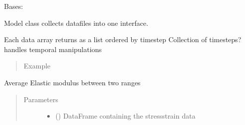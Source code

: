 \documentclass[letterpaper,10pt,english]{sphinxmanual}
\begin{document}
\begin{fulllineitems}
\label{\detokenize{openfdem:openfdem.openfdem.Model}}
Bases: 

Model class collects datafiles into one interface.

Each data array returns as a list ordered by timestep
Collection of timesteps?
handles temporal manipulations
\begin{quote}\begin{description}
\item[{Example}] \leavevmode
\begin{sphinxVerbatim}[commandchars=\\\{\}]
   
  
\end{sphinxVerbatim}

\end{description}\end{quote}

\begin{fulllineitems}
\label{\detokenize{openfdem:openfdem.openfdem.Model.Eavg_mod}}
Average Elastic modulus between two ranges
\begin{quote}\begin{description}
\item[{Parameters}] \leavevmode\begin{itemize}
\item {} 
 () \textendash{} DataFrame containing the stress\sphinxhyphen{}strain data


\end{itemize}
\end{description}
\end{quote}
\end{fulllineitems}
\end{fulllineitems}
\end{document}
